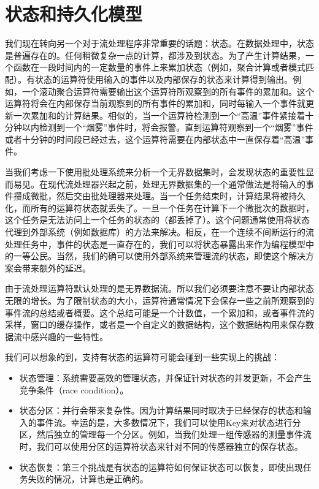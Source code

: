 \documentclass[cn,11pt,chinese]{elegantbook}
\providecommand{\tightlist}{%
  \setlength{\itemsep}{0pt}\setlength{\parskip}{0pt}}
\begin{document}
\hypertarget{ux72b6ux6001ux548cux6301ux4e45ux5316ux6a21ux578b}{%
\section{状态和持久化模型}\label{ux72b6ux6001ux548cux6301ux4e45ux5316ux6a21ux578b}}

我们现在转向另一个对于流处理程序非常重要的话题：状态。在数据处理中，状态是普遍存在的。任何稍微复杂一点的计算，都涉及到状态。为了产生计算结果，一个函数在一段时间内的一定数量的事件上来累加状态（例如，聚合计算或者模式匹配）。有状态的运算符使用输入的事件以及内部保存的状态来计算得到输出。例如，一个滚动聚合运算符需要输出这个运算符所观察到的所有事件的累加和。这个运算符将会在内部保存当前观察到的所有事件的累加和，同时每输入一个事件就更新一次累加和的计算结果。相似的，当一个运算符检测到一个``高温''事件紧接着十分钟以内检测到一个``烟雾''事件时，将会报警。直到运算符观察到一个``烟雾''事件或者十分钟的时间段已经过去，这个运算符需要在内部状态中一直保存着``高温''事件。

当我们考虑一下使用批处理系统来分析一个无界数据集时，会发现状态的重要性显而易见。在现代流处理器兴起之前，处理无界数据集的一个通常做法是将输入的事件攒成微批，然后交由批处理器来处理。当一个任务结束时，计算结果将被持久化，而所有的运算符状态就丢失了。一旦一个任务在计算下一个微批次的数据时，这个任务是无法访问上一个任务的状态的（都丢掉了）。这个问题通常使用将状态代理到外部系统（例如数据库）的方法来解决。相反，在一个连续不间断运行的流处理任务中，事件的状态是一直存在的，我们可以将状态暴露出来作为编程模型中的一等公民。当然，我们的确可以使用外部系统来管理流的状态，即使这个解决方案会带来额外的延迟。

由于流处理运算符默认处理的是无界数据流。所以我们必须要注意不要让内部状态无限的增长。为了限制状态的大小，运算符通常情况下会保存一些之前所观察到的事件流的总结或者概要。这个总结可能是一个计数值，一个累加和，或者事件流的采样，窗口的缓存操作，或者是一个自定义的数据结构，这个数据结构用来保存数据流中感兴趣的一些特性。

我们可以想象的到，支持有状态的运算符可能会碰到一些实现上的挑战：

\begin{itemize}
\tightlist
\item
  状态管理：系统需要高效的管理状态，并保证针对状态的并发更新，不会产生竞争条件（race
  condition）。
\item
  状态分区：并行会带来复杂性。因为计算结果同时取决于已经保存的状态和输入的事件流。幸运的是，大多数情况下，我们可以使用Key来对状态进行分区，然后独立的管理每一个分区。例如，当我们处理一组传感器的测量事件流时，我们可以使用分区的运算符状态来针对不同的传感器独立的保存状态。
\item
  状态恢复：第三个挑战是有状态的运算符如何保证状态可以恢复，即使出现任务失败的情况，计算也是正确的。
\end{itemize}
\end{document}
